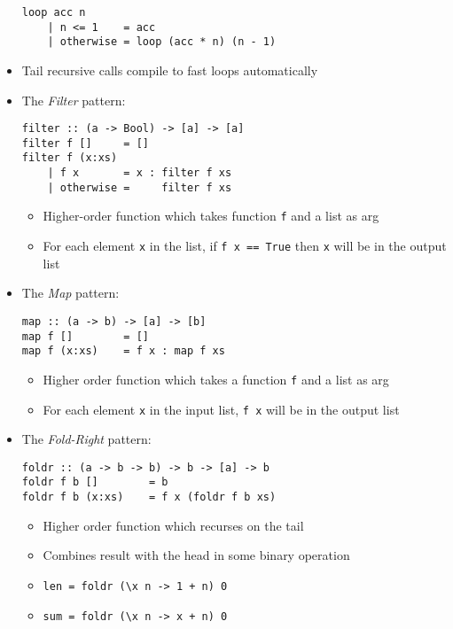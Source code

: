 \documentclass[landscape,8pt]{extarticle}
\newcommand{\code}{\lstinline}
\begin{document}
\begin{multicols}{4}
\begin{itemize}
              \begin{lstlisting}
loop acc n
    | n <= 1    = acc
    | otherwise = loop (acc * n) (n - 1)
              \end{lstlisting}
        \item Tail recursive calls compile to fast loops automatically
        \item The \emph{Filter} pattern:
              \begin{lstlisting}
filter :: (a -> Bool) -> [a] -> [a]
filter f []     = []
filter f (x:xs)
    | f x       = x : filter f xs
    | otherwise =     filter f xs
              \end{lstlisting}
              \begin{itemize}
                  \item Higher-order function which takes function \code{f} and a list as arg
                  \item For each element \code{x} in the list, if \code{f x == True} then \code{x} will be in the output list
              \end{itemize}
        \item The \emph{Map} pattern:
              \begin{lstlisting}
map :: (a -> b) -> [a] -> [b]
map f []        = []
map f (x:xs)    = f x : map f xs
              \end{lstlisting}
              \begin{itemize}
                  \item Higher order function which takes a function \code{f} and a list as arg
                  \item For each element \code{x} in the input list, \code{f x} will be in the output list
              \end{itemize}
        \item The \emph{Fold-Right} pattern:
              \begin{lstlisting}
foldr :: (a -> b -> b) -> b -> [a] -> b
foldr f b []        = b
foldr f b (x:xs)    = f x (foldr f b xs)
            \end{lstlisting}
            \begin{itemize}
                \item Higher order function which recurses on the tail
                \item Combines result with the head in some binary operation
                \item \code{len = foldr (\x n -> 1 + n) 0}
                \item \code{sum = foldr (\x n -> x + n) 0}

\end{itemize}
\end{itemize}
\end{multicols}
\end{document}
